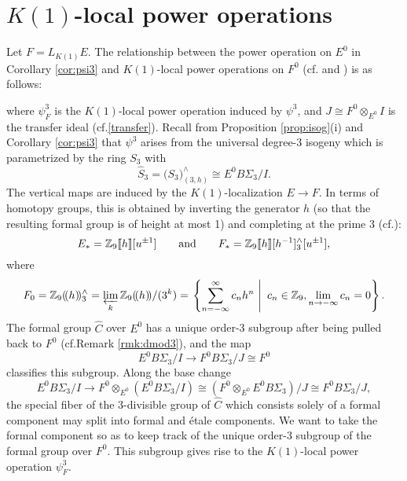 \documentclass{gtpart}
\theoremstyle{definition}
\theoremstyle{remark}
\newcommand{\mb}[1]{\mathbb{#1}}
\newcommand{\cf}{cf.\thinspace}
\newcommand{\BZ}{{\mb Z}}
\newcommand{\HC}{\widehat{C}}
\newcommand{\HS}{\widehat{S}}
\newcommand{\ad}{{\rm and}}
\newcommand{\p}{\psi^3}
\newcommand{\isog}[1]{Proposition \ref{prop:isog}\thinspace (#1)}
\begin{document}
\section{$K(1)$-local power operations}
\label{sec:K(1)}

Let $F = L_{K(1)} E$.  The relationship between the power operation on $E^0$ in Corollary \ref{cor:psi3} 
and $K(1)$-local power operations on $F^0$ (\cf \cite[Section 3]{K(1)E_infty} and \cite[Section IX.3]{H_infty}) is as follows: 
\begin{center}
\end{center}
where $\psi_F^3$ is the $K(1)$-local power operation induced by $\p$, and $J \cong F^0 \otimes_{E^0} I$ is the transfer ideal (\cf \eqref{transfer}).  
Recall from \isog{i} and Corollary \ref{cor:psi3} that $\p$ arises from the universal degree-3 isogeny 
which is parametrized by the ring $S_3$ with 
\[
 \HS_3 = \big( S_3 \big)_{(3,h)}^\wedge \cong E^0 B\Sigma_3 / I.  
\]
The vertical maps are induced by the $K(1)$-localization $E \to F$.  In terms of 
homotopy groups, this is obtained by inverting the generator $h$ (so that 
the resulting formal group is of height at most 1) and completing at the prime 3 (\cf \cite[Corollary 1.5.5]{hovey}): 
\[
 E_* = \BZ_9 \llbracket h \rrbracket [u^{\pm1}] \qquad \ad \qquad F_* = \BZ_9 \llbracket h \rrbracket [h^{-1}]_3^\wedge [u^{\pm1}], 
\]
where 
\begin{equation}
\label{K(1)homotopy}
 F_0 = \BZ_9 (\!(h)\!)_3^\wedge = \varprojlim_k \BZ_9 (\!(h)\!) /(3^k) = 
 \left.\left\{\sum_{n = -\infty}^{\infty} c_n h^n~\right|~c_n \in \BZ_9, 
 \lim_{n \to -\infty} c_n = 0\right\}.  
\end{equation}
The formal group $\HC$ over $E^0$ has a unique order-3 subgroup after being pulled back to $F^0$ (\cf Remark \ref{rmk:dmod3}), 
and the map 
\[
 E^0 B\Sigma_3 / I \to F^0 B\Sigma_3 / J \cong F^0 
\]
classifies this subgroup.  Along the base change 
\[
 E^0 B\Sigma_3 / I \to F^0 \otimes_{E^0} (E^0 B\Sigma_3 / I) \cong (F^0 \otimes_{E^0} E^0 B\Sigma_3) / J \cong F^0 B\Sigma_3 / J, 
\]
the special fiber of the 3-divisible group of $\HC$ which consists solely of a formal component may split into formal and \'etale components.  
We want to take the formal component so as to keep track of the unique order-3 subgroup of the formal group over $F^0$.  
This subgroup gives rise to the $K(1)$-local power operation $\psi_F^3$.  
\end{document}
